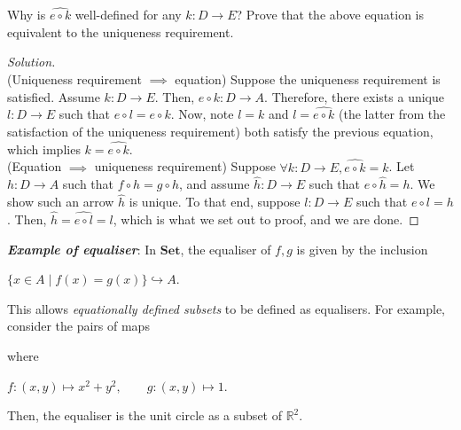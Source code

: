 \documentclass[]{amsbook}
\newcommand{\qq}{\qquad}
\newcommand{\catname}[1]{\mathbf{#1}}
\newcommand{\R}{\mathbb{R}}
\newcommand{\0}{\mathbf{0}}
\newcommand{\1}{\mathbf{1}}
\newenvironment{solution}
    {\begin{proof}[Solution]}{\end{proof}}
\begin{document}
\setcounter{Exercise}{38}
\begin{Exercise}
Why is $\widehat{e \circ k}$ well-defined for any $k: D \to E$? Prove that
the above equation is equivalent to the uniqueness requirement.
\end{Exercise}
\begin{solution}
~\\
(Uniqueness requirement $\implies$ equation) Suppose the uniqueness requirement
is satisfied. Assume $k: D \to E$. Then, $e \circ k : D \to A$. Therefore, there
exists a unique $l : D \to E$ such that $e \circ l = e \circ k$. Now, note $l =
k$ and $l = \widehat{e \circ k}$ (the latter from the satisfaction of the
uniqueness requirement) both satisfy the previous equation, which implies $k =
\widehat{e \circ k}$.\\
(Equation $\implies$ uniqueness requirement) Suppose $\forall k : D \to E,
\widehat{e \circ k} = k$. Let $h : D \to A$ such that $f \circ h = g \circ h$,
and assume $\hat{h} : D \to E$ such that $e \circ \hat{h} = h$. We show such an
arrow $\hat{h}$ is unique. To that end, suppose $l : D \to E$ such that $e \circ
l = h$. Then, $\hat{h} = \widehat{e \circ l} = l$, which is what we set out to
proof, and we are done.
\end{solution}

\emph{\textbf{Example of equaliser}}: In $\catname{Set}$, the equaliser of $f,
g$ is given by the inclusion
\begin{center}
    $\{ x \in A \mid f(x) = g(x) \} \hookrightarrow A$.
\end{center}
This allows \emph{equationally defined subsets} to be defined as equalisers.
For example, consider the pairs of maps
where
\begin{center}
    $f : (x, y) \mapsto x^2 + y^2, \qq g : (x, y) \mapsto 1$.
\end{center}
Then, the equaliser is the unit circle as a subset of $\R^2$.\\
\end{document}
